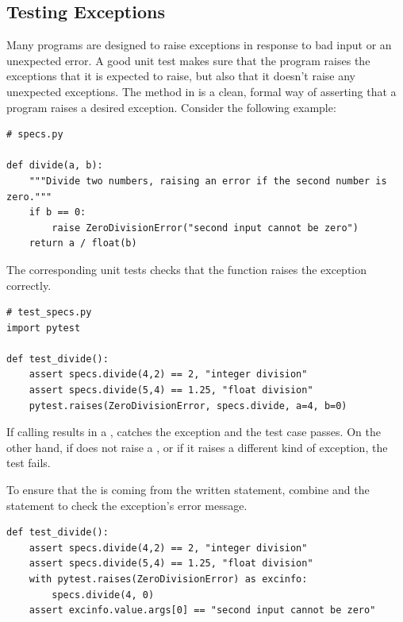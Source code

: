 \subsection*{Testing Exceptions} %

Many programs are designed to raise exceptions in response to bad input or an unexpected error.
A good unit test makes sure that the program raises the exceptions that it is expected to raise, but also that it doesn't raise any unexpected exceptions.
The  method in  is a clean, formal way of asserting that a program raises a desired exception.
Consider the following example:

\begin{lstlisting}
# specs.py

def divide(a, b):
    """Divide two numbers, raising an error if the second number is zero."""
    if b == 0:
        raise ZeroDivisionError("second input cannot be zero")
    return a / float(b)
\end{lstlisting}

The corresponding unit tests checks that the function raises the exception correctly.

\begin{lstlisting}
# test_specs.py
import pytest

def test_divide():
    assert specs.divide(4,2) == 2, "integer division"
    assert specs.divide(5,4) == 1.25, "float division"
    pytest.raises(ZeroDivisionError, specs.divide, a=4, b=0)
\end{lstlisting}

If calling  results in a ,  catches the exception and the test case passes.
On the other hand, if  does not raise a , or if it raises a different kind of exception, the test fails.

To ensure that the  is coming from the written  statement, combine  and the  statement to check the exception's error message.

\begin{lstlisting}
def test_divide():
    assert specs.divide(4,2) == 2, "integer division"
    assert specs.divide(5,4) == 1.25, "float division"
    with pytest.raises(ZeroDivisionError) as excinfo:
        specs.divide(4, 0)
    assert excinfo.value.args[0] == "second input cannot be zero"
\end{lstlisting}

